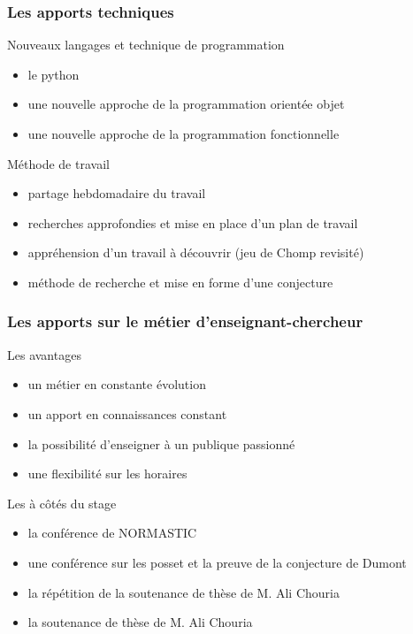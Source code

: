 \documentclass{beamer}
\begin{document}
  \begin{frame}
    \frametitle{Les apports techniques}
    
    \begin{block}{Nouveaux langages et technique de programmation}  
      \begin{itemize}
        \item le python
        \item une nouvelle approche de la programmation orientée objet
        \item une nouvelle approche de la programmation fonctionnelle
      \end{itemize}
    \end{block}
    \pause
    \begin{block}{Méthode de travail}
      \begin{itemize}
        \item partage hebdomadaire du travail
        \item recherches approfondies et mise en place d'un plan de travail
        \item appréhension d'un travail à découvrir (jeu de Chomp revisité)
        \item méthode de recherche et mise en forme d'une conjecture
      \end{itemize}
    \end{block}
  \end{frame}

  \begin{frame}
    \frametitle{Les apports sur le métier d'enseignant-chercheur}
    \begin{block}{Les avantages}
      \begin{itemize}
        \item un métier en constante évolution
        \item un apport en connaissances constant
        \item la possibilité d'enseigner à un publique passionné
        \item une flexibilité sur les horaires
      \end{itemize}
    \end{block}
    \pause
    \begin{block}{Les à côtés du stage}
      \begin{itemize}
        \item la conférence de NORMASTIC
        \item une conférence sur les posset et la preuve de la conjecture de Dumont
        \item la répétition de la soutenance de thèse de M. Ali Chouria
        \item la soutenance de thèse de M. Ali Chouria
      \end{itemize}
    \end{block}
  \end{frame}
\end{document}
